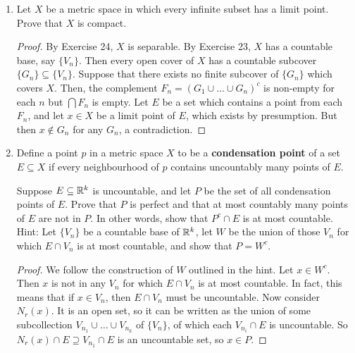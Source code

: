 \begin{enumerate}
\begin{proof}
For $n \in \N$, consider the cover $\{N_{1/n}(x): x \in K\}$. Since $K$ is compact, some finite subset of these neighbourhoods must cover $K$. From the same conclusion as in Exercise 24, the set $G$ of all the centres of the neighbourhoods for $n \in \N$ forms a countable dense set in $K$, so $K$ is separable.
\end{proof}

\item %
Let $X$ be a metric space in which every infinite subset has a limit point. Prove that $X$ is compact. 

\begin{proof}
By Exercise 24, $X$ is separable. By Exercise 23, $X$ has a countable base, say $\{V_n\}$. Then every open cover of $X$ has a countable subcover $\{G_n\} \subseteq \{V_n\}$. Suppose that there exists no finite subcover of $\{G_n\}$ which covers $X$. Then, the complement $F_n = \left( G_1 \cup \dotsc \cup G_n\right)^c$ is non-empty for each $n$ but $\bigcap F_n$ is empty. Let $E$ be a set which contains a point from each $F_n$, and let $x \in X$ be a limit point of $E$, which exists by presumption. But then $x \not\in G_n$ for any $G_n$, a contradiction.
\end{proof}

\item %
Define a point $p$ in a metric space $X$ to be a \textbf{condensation point} of a set $E \subseteq X$ if every neighbourhood of $p$ contains uncountably many points of $E$.

Suppose $E \subseteq \mathbb{R}^k$ is uncountable, and let $P$ be the set of all condensation points of $E$. Prove that $P$ is perfect and that at most countably many points of $E$ are not in $P$. In other words, show that $P^c \cap E$ is at most countable. Hint: Let $\{V_n\}$ be a countable base of $\mathbb{R}^k$, let $W$ be the union of those $V_n$ for which $E \cap V_n$ is at most countable, and show that $P = W^c$.

\begin{proof}
We follow the construction of $W$ outlined in the hint. Let $x \in W^c$. Then $x$ is not in any $V_n$ for which $E \cap V_n$ is at most countable. In fact, this means that if $x \in V_n$, then $E \cap V_n$ must be uncountable. Now consider $N_r(x)$. It is an open set, so it can be written as the union of some subcollection $V_{n_1} \cup \dotsc \cup V_{n_k}$ of $\{V_n\}$, of which each $V_{n_i} \cap E$ is uncountable. So $N_r(x) \cap E \supseteq V_{n_1} \cap E$ is an uncountable set, so $x \in P$.


\end{proof}
\end{enumerate}
